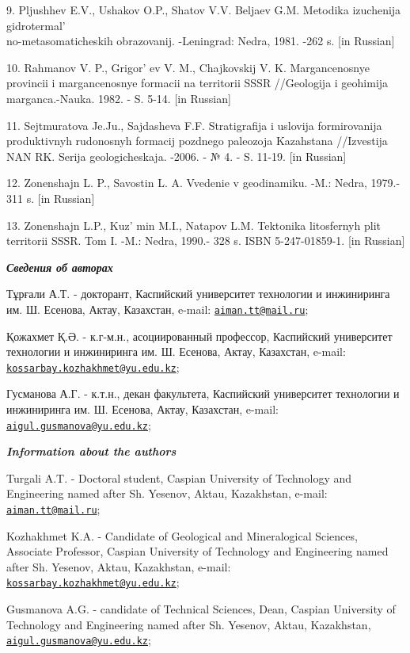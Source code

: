 \begin{references}
9. Pljushhev E.V., Ushakov O.P., Shatov V.V. Beljaev G.M. Metodika
izuchenija gidrotermal' \\no-metasomaticheskih obrazovanij.
-Leningrad: Nedra, 1981. -262 s. {[}in Russian{]}

10. Rahmanov V. P., Grigor' ev V. M., Chajkovskij V. K.
Margancenosnye provincii i margancenosnye formacii na territorii SSSR
//Geologija i geohimija marganca.-Nauka. 1982. - S. 5-14. {[}in
Russian{]}

11. Sejtmuratova Je.Ju., Sajdasheva F.F. Stratigrafija i uslovija
formirovanija produktivnyh rudonosnyh formacij pozdnego paleozoja
Kazahstana //Izvestija NAN RK. Serija geologicheskaja. -2006. - № 4. -
S. 11-19. {[}in Russian{]}

12. Zonenshajn L. P., Savostin L. A. Vvedenie v geodinamiku. -M.: Nedra,
1979.- 311 s. {[}in Russian{]}

13. Zonenshajn L.P., Kuz' min M.I., Natapov L.M.
Tektonika litosfernyh plit territorii SSSR. Tom I. -M.: Nedra, 1990.-
328 s. ISBN 5-247-01859-1. {[}in Russian{]}
\end{references}

\begin{authorinfo}
\emph{{\bfseries Сведения об авторах}}

Тұрғали А.Т. - докторант, Каспийский университет технологии и
инжиниринга им. Ш. Есенова, Актау, Казахстан, e-mail:
\href{mailto:aiman.tt@mail.ru}{\nolinkurl{aiman.tt@mail.ru}};

Қожахмет Қ.Ә. - к.г-м.н., асоциированный профессор, Каспийский
университет технологии и инжиниринга им. Ш. Есенова, Актау, Казахстан,
e-mail:
\href{mailto:kossarbay.kozhakhmet@yu.edu.kz}{\nolinkurl{kossarbay.kozhakhmet@yu.edu.kz}};

Гусманова А.Г. - к.т.н., декан факультета, Каспийский университет
технологии и инжиниринга им. Ш. Есенова, Актау, Казахстан, e-mail:
\href{mailto:aigul.gusmanova@yu.edu.kz}{\nolinkurl{aigul.gusmanova@yu.edu.kz}};

\emph{{\bfseries Information about the authors}}

Turgali A.T. - Doctoral student, Caspian University of Technology and
Engineering named after Sh. Yesenov, Aktau, Kazakhstan, e-mail:
\href{mailto:aiman.tt@mail.ru}{\nolinkurl{aiman.tt@mail.ru}};

Kozhakhmet K.A. - Candidate of Geological and Mineralogical Sciences,
Associate Professor, Caspian University of Technology and Engineering
named after Sh. Yesenov, Aktau, Kazakhstan, e-mail:
\href{mailto:kossarbay.kozhakhmet@yu.edu.kz}{\nolinkurl{kossarbay.kozhakhmet@yu.edu.kz}};

Gusmanova A.G. - candidate of Technical Sciences, Dean, Caspian
University of Technology and Engineering named after Sh. Yesenov, Aktau,
Kazakhstan,
\href{mailto:aigul.gusmanova@yu.edu.kz}{\nolinkurl{aigul.gusmanova@yu.edu.kz}};
\end{authorinfo}
